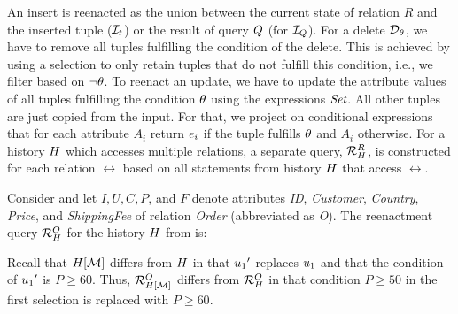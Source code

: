 An insert is reenacted as the union between the current state of relation $R$ and the inserted tuple ($\mathcal{I}_{t}$) or the result of query $Q$ (for $\mathcal{I}_{Q}$). For a delete $\mathcal{D}_{\theta}$, we have to remove all tuples fulfilling the condition of the delete. This is achieved by using a selection to only retain tuples that do not fulfill this condition, i.e., we filter based on $\neg \theta$. To reenact an update, we have to update the attribute values of all tuples fulfilling the condition $\theta$ using the expressions $\textit{Set}$. All other tuples are just copied from the input. For that, we project on conditional expressions that for each attribute $A_i$ return $e_i$ if the tuple fulfills $\theta$ and $A_i$ otherwise.
For a history $H$ which accesses multiple relations, a separate query,  $\mathcal{R}^{R}_{H}$, is constructed for each relation $\rel$ based on all statements from  history $H$ that access $\rel$.

\begin{exam}\label{ex:reenact-example}
  Consider  and let $I,U,C,P$, and $F$ denote attributes \emph{ID}, \emph{Customer}, \emph{Country}, \emph{Price}, and \emph{ShippingFee} of relation \emph{Order} (abbreviated as \emph{O}). The reenactment query $\mathcal{R}^{O}_{H}$ for the history $H$ from  is:

\vspace{-1mm}

Recall that $H[\mathcal{M}]$ differs from $H$ in that ${u_1}'$ replaces $u_1$ and that the condition of ${u_1}'$ is $P \geq 60$. Thus,
$\mathcal{R}^{O}_{H[\mathcal{M}]}$ differs from $\mathcal{R}^{O}_{H}$ in that condition $P \geq 50$ in the first selection is replaced with $P \geq 60$.
\end{exam}







